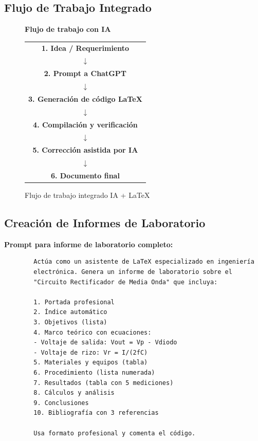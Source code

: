 \documentclass[11pt,letterpaper]{article}
\begin{document}
\subsection{Flujo de Trabajo Integrado}

\begin{figure}[H]
	\centering
	\begin{tcolorbox}[colback=grisclaro, colframe=azulprofundo, arc=5pt]
		\centering
		\textbf{Flujo de trabajo con IA}
		\vspace{0.3cm}
		
		\begin{tabular}{c}
			\textbf{1. Idea / Requerimiento} \\
			$\downarrow$ \\
			\textbf{2. Prompt a ChatGPT} \\
			$\downarrow$ \\
			\textbf{3. Generación de código \LaTeX} \\
			$\downarrow$ \\
			\textbf{4. Compilación y verificación} \\
			$\downarrow$ \\
			\textbf{5. Corrección asistida por IA} \\
			$\downarrow$ \\
			\textbf{6. Documento final}
		\end{tabular}
	\end{tcolorbox}
	\caption{Flujo de trabajo integrado IA + \LaTeX}
	\label{fig:flujo}
\end{figure}

\subsection{Creación de Informes de Laboratorio}

\begin{cajaiaclaro}
	\textbf{Prompt para informe de laboratorio completo:}
	\begin{verbatim}
		Actúa como un asistente de LaTeX especializado en ingeniería 
		electrónica. Genera un informe de laboratorio sobre el 
		"Circuito Rectificador de Media Onda" que incluya:
		
		1. Portada profesional
		2. Índice automático
		3. Objetivos (lista)
		4. Marco teórico con ecuaciones:
		- Voltaje de salida: Vout = Vp - Vdiodo
		- Voltaje de rizo: Vr = I/(2fC)
		5. Materiales y equipos (tabla)
		6. Procedimiento (lista numerada)
		7. Resultados (tabla con 5 mediciones)
		8. Cálculos y análisis
		9. Conclusiones
		10. Bibliografía con 3 referencias
		
		Usa formato profesional y comenta el código.
	\end{verbatim}
\end{cajaiaclaro}
\end{document}
